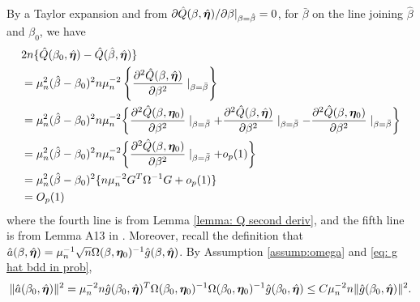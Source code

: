 \documentclass[12pt]{article}
\begin{document}
{By a Taylor expansion and from $\partial \hat Q(\beta, \hat{\bm \eta})/\partial \beta |_{\beta=\hat\beta}=0$, for  $\bar\beta$ on the line joining $\hat\beta$ and $\beta_0$, we have 
\begin{align*}
	& 2n \{  \hat Q (\beta_0, \hat {\bm \eta} )   -  \hat Q (\hat\beta, \hat {\bm \eta} )   \}  \\
	& =  \mu_n^2 (\hat\beta - \beta_0 )^2 n \mu_n^{-2}\left\{  \frac{\partial^2  \hat Q ( \beta, \hat{\bm \eta})}{\partial \beta^2 } \mid_{\beta = \bar\beta}\right\}   \\ 
	&=  \mu_n^2 (\hat\beta - \beta_0 )^2 n \mu_n^{-2} \bigg\{  \frac{\partial^2  \hat Q ( \beta, \bm \eta_0)}{\partial \beta^2 } \mid_{\beta = \bar\beta} +{\frac{\partial^2  \hat Q ( \beta, \hat {\bm \eta})}{\partial \beta^2 } \mid_{\beta = \bar\beta}  - \frac{\partial^2  \hat Q ( \beta,  \bm \eta_0 )}{\partial \beta^2 } \mid_{\beta = \bar\beta} } \bigg\} \\
	&=   \mu_n^2 (\hat\beta - \beta_0 )^2  n \mu_n^{-2} \bigg\{  \frac{\partial^2  \hat Q ( \beta, \bm \eta_0)}{\partial \beta^2 } \mid_{\beta = \bar\beta}  +o_p(1) \bigg\} \\
	&= \mu_n^2 (\hat\beta - \beta_0 )^2 \{  n \mu_n^{-2} G^T \Omega^{-1} G +o_p(1) \}  \\
	&= O_p(1) 
\end{align*}
where the fourth line is from Lemma \ref{lemma: Q second deriv}, and the fifth line is from Lemma A13 in \cite{Newey:2009aa}. Moreover, recall the definition that $\hat a(\beta, \hat{\bm \eta})= \mu_n^{-1} \sqrt{n} \Omega(\beta, \bm \eta_0)^{-1}\hat g(\beta, \hat{\bm \eta}) $. By Assumption \ref{assump:omega} and \eqref{eq: g hat bdd in prob}, 
\begin{align*}
	\|\hat a(\beta_0, \hat{\bm \eta})\|^2= \mu_n^{-2} n \hat g(\beta_0, \hat{\bm \eta})^T \Omega(\beta_0, \bm \eta_0)^{-1}    \Omega(\beta_0, \bm \eta_0)^{-1}  \hat g(\beta_0, \hat{\bm \eta}) \leq C \mu_n^{-2} n \| \hat g(\beta_0, \hat{\bm \eta})\|^2. 
\end{align*}

}
\end{document}
